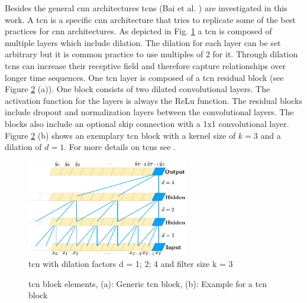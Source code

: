 \documentclass[conference]{IEEEtran}
\begin{document}
Besides the general \gls{cnn} architectures \glspl{tcn} (Bai et al. \cite{Bai2018}) are investigated in this work. A \gls{tcn} is a specific \gls{cnn} architecture that tries to replicate some of the best practices for \gls{cnn} architectures. As depicted in Fig. \ref{fig:tcn_architecture} a \gls{tcn} is composed of multiple layers which include dilation. The dilation for each layer can be set arbitrary but it is common practice to use multiples of $ 2 $ for it. Through dilation \glspl{tcn} can increase their receptive field and therefore capture relationships over longer time sequences. One \gls{tcn} layer is composed of a \gls{tcn} residual block (see Figure \ref{fig:tcn_block} (a)). One block consists of two dilated convolutional layers. The activation function for the layers is always the ReLu function. The residual blocks include dropout and normalization layers between the convolutional layers. The blocks also include an optional skip connection with a 1x1 convolutional layer. Figure \ref{fig:tcn_block} (b) shows an exemplary \gls{tcn} block with a kernel size of $ k = 3 $ and a dilation of $ d = 1 $. For more details on \glspl{tcn} see \cite{Bai2018}.

\begin{figure}[htp]
	\centering
	\includegraphics[width=7cm]{tcn_architecture.pdf}
	\caption{\gls{tcn} with dilation factors d = 1; 2; 4 and filter size k = 3 \cite{Bai2018}}
	\label{fig:tcn_architecture}
\end{figure}

\begin{figure}[htp]
	\centering
	\quad
	\caption{\gls{tcn} block elements, (a): Generic \gls{tcn} block, (b): Example for a \gls{tcn} block \cite{Bai2018}}
	\label{fig:tcn_block}
\end{figure}
\end{document}
